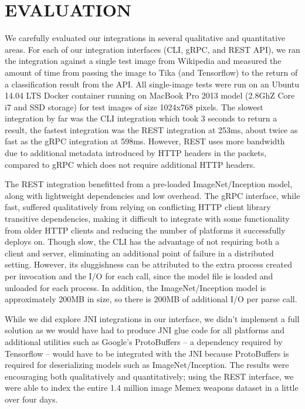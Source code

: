 \section {EVALUATION} \label{sec:evaluation}

We carefully evaluated our integrations in several qualitative and quantitative areas. For each of our integration interfaces (CLI, gRPC, and REST API), we ran the integration against a single test image from Wikipedia and measured the amount of time from passing the image to Tika (and Tensorflow) to the return of a classification result from the API. All single-image tests were run on an Ubuntu 14.04 LTS Docker container running on MacBook Pro 2013 model (2.8GhZ Core i7 and SSD storage) for test images of size 1024x768 pixels. The slowest integration by far was the CLI integration which took 3 seconds to return a result, the fastest integration was the REST integration at 253ms, about twice as fast as the gRPC integration at 598ms. However, REST uses more bandwidth due to additional metadata introduced by HTTP headers in the packets, compared to gRPC which does not require additional HTTP headers.

The REST integration benefitted from a pre-loaded ImageNet/Inception model, along with lightweight dependencies and low overhead. The gRPC interface, while fast, suffered qualitatively from relying on conflicting HTTP client library transitive dependencies, making it difficult to integrate with some functionality from older HTTP clients and reducing the number of platforms it successfully deploys on. Though slow, the CLI has the advantage of not requiring both a client and server, eliminating an additional point of failure in a distributed setting. However, its sluggishness can be attributed to the extra process created per invocation and the I/O for each call, since the model file is loaded and unloaded for each process. In addition, the ImageNet/Inception model is approximately 200MB in size, so there is 200MB of additional I/O per parse call.

While we did explore JNI integrations in our interface, we didn't implement a full solution as we would have had to produce JNI glue code for all platforms and additional utilities such as Google's ProtoBuffers -- a dependency required by Tensorflow -- would have to be integrated with the JNI because ProtoBuffers is required for deserializing models such as ImageNet/Inception\cite{javacpp-240}. The results  were encouraging both qualitatively and quantitatively; using the REST interface, we were able to index the entire 1.4 million image Memex weapons dataset in a little over four days.

